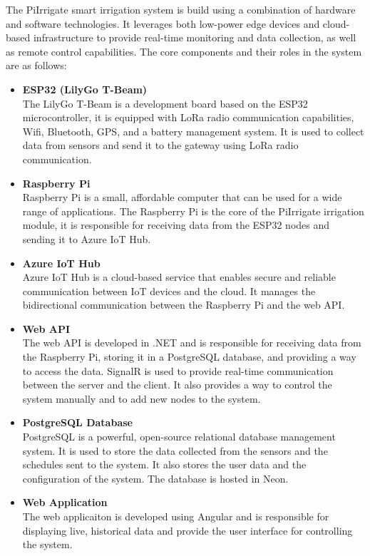 The PiIrrigate smart irrigation system is build using a combination of hardware and software technologies.
It leverages both low-power edge devices and cloud-based infrastructure to provide real-time monitoring
and data collection, as well as remote control capabilities.
The core components and their roles in the system are as follows:
\begin{itemize}
  \item \textbf{ESP32 (LilyGo T-Beam)} \\
  The LilyGo T-Beam is a development board based on the ESP32 microcontroller, it is equipped with
  LoRa radio communication capabilities, Wifi, Bluetooth, GPS, and a battery management system.
  It is used to collect data from sensors and send it to the gateway using LoRa radio communication.

  \item \textbf{Raspberry Pi} \\
  Raspberry Pi is a small, affordable computer that can be used for a wide range of applications.
  The Raspberry Pi is the core of the PiIrrigate irrigation module, 
  it is responsible for receiving data from the ESP32 nodes and sending it to Azure IoT Hub.

  \item \textbf{Azure IoT Hub} \\
  Azure IoT Hub is a cloud-based service that enables secure and reliable communication 
  between IoT devices and the cloud.
  It manages the bidirectional communication between the Raspberry Pi and the web API.

  \item \textbf{Web API} \\
  The web API is developed in .NET and is responsible for receiving data from the Raspberry Pi,
  storing it in a PostgreSQL database, and providing a way to access the data.
  SignalR is used to provide real-time communication between the server and the client.
  It also provides a way to control the system manually and to add new nodes to the system.

  \item \textbf{PostgreSQL Database} \\
  PostgreSQL is a powerful, open-source relational database management system.
  It is used to store the data collected from the sensors and the schedules sent to the system. It also
  stores the user data and the configuration of the system. The database is hosted in Neon.

  \item \textbf{Web Application} \\
  The web applicaiton is developed using Angular and is responsible for displaying live, historical data
  and provide the user interface for controlling the system.
\end{itemize}

